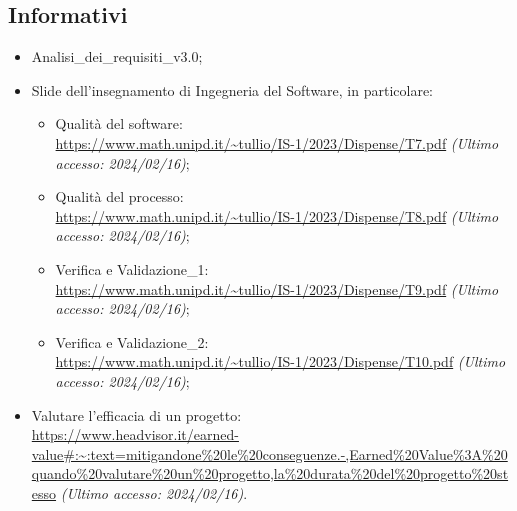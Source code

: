 \subsection{Informativi}
\begin{itemize}
    \item Analisi\_dei\_requisiti\_v3.0;
    \item Slide dell’insegnamento di Ingegneria del Software, in particolare:
        \begin{itemize}
            \item Qualità del software: \\ \url{https://www.math.unipd.it/~tullio/IS-1/2023/Dispense/T7.pdf} \textit{(Ultimo accesso: 2024/02/16)};
            \item Qualità del processo:\\ \url{https://www.math.unipd.it/~tullio/IS-1/2023/Dispense/T8.pdf} \textit{(Ultimo accesso: 2024/02/16)};
            \item Verifica e Validazione\_1:\\ \url{https://www.math.unipd.it/~tullio/IS-1/2023/Dispense/T9.pdf} \textit{(Ultimo accesso: 2024/02/16)};
            \item Verifica e Validazione\_2:\\ \url{https://www.math.unipd.it/~tullio/IS-1/2023/Dispense/T10.pdf} \textit{(Ultimo accesso: 2024/02/16)};
        \end{itemize}
    \item Valutare l'efficacia di un progetto: \\ \url{https://www.headvisor.it/earned-value#:~:text=mitigandone%20le%20conseguenze.-,Earned%20Value%3A%20quando%20valutare%20un%20progetto,la%20durata%20del%20progetto%20stesso} \textit{(Ultimo accesso: 2024/02/16)}.
\end{itemize}
